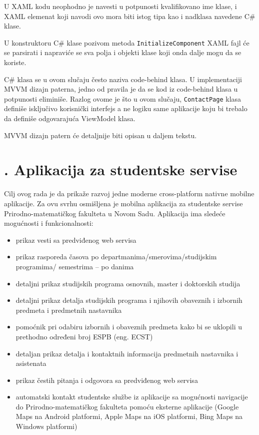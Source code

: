 \documentclass[a4paper]{article}
\newcommand\liststyleLvii{%
\renewcommand\labelitemi{•}
\renewcommand\labelitemii{◦}
\renewcommand\labelitemiii{${\blacksquare}$}
\renewcommand\labelitemiv{•}
}
\begin{document}
U XAML kodu neophodno je navesti u potpunosti kvalifikovano ime klase, i
XAML elemenat koji navodi ovo mora biti istog tipa kao i nadklasa
navedene C\# klase.

U konstruktoru C\# klase pozivom metoda
\texttt{\textcolor[rgb]{0.0,0.4,0.8}{InitializeComponent}} XAML fajl će
se parsirati i napraviće se sva polja i objekti klase koji onda dalje
mogu da se koriste.

C\# klasa se u ovom slučaju često naziva code-behind klasa. U
implementaciji MVVM dizajn paterna, jedno od pravila je da se kod iz
code-behind klasa u potpunosti eliminiše. Razlog ovome je što u ovom
slučaju, \texttt{\textcolor[rgb]{0.0,0.4,0.8}{ContactPage}} klasa
definiše isključivo korisnički interfejs a ne logiku same aplikacije
koju bi trebalo da definiše odgovarajuća ViewModel klasa.

MVVM dizajn patern će detaljnije biti opisan u daljem tekstu.

\clearpage\section[7. Aplikacija za studentske servise]{.
Aplikacija za studentske servise}
\hypertarget{RefHeadingToc4211813786090}{}Cilj ovog rada je da prikaže
razvoj jedne moderne cross-platform nativne mobilne aplikacije. Za ovu
svrhu osmišljena je mobilna aplikacija za studentske servise
Prirodno-matematičkog fakulteta u Novom Sadu. Aplikacija ima sledeće
mogućnosti i funkcionalnosti:

\liststyleLvii
\begin{itemize}
\item prikaz vesti sa predviđenog web servisa
\item prikaz rasporeda časova po departmanima/smerovima/studijskim
programima/ semestrima – po danima
\item detaljni prikaz studijskih programa osnovnih, master i doktorskih
studija
\item detaljni prikaz detalja studijskih programa i njihovih obaveznih i
izbornih predmeta i predmetnih nastavnika
\item pomoćnik pri odabiru izbornih i obaveznih predmeta kako bi se
uklopili u prethodno određeni broj ESPB (eng. ECST)
\item detaljan prikaz detalja i kontaktnih informacija predmetnih
nastavnika i asistenata
\item prikaz čestih pitanja i odgovora sa predviđenog web servisa
\item automatski kontakt studentske službe iz aplikacije sa mogućnosti
navigacije do Prirodno-matematičkog fakulteta pomoću eksterne
aplikacije (Google Maps na Android platformi, Apple Maps na iOS
platformi, Bing Maps na Windows platformi)
\end{itemize}
\end{document}
